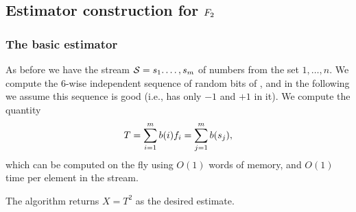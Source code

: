 
\subsection{Estimator construction for $F_2$}
\subsubsection{The basic estimator}

As before we have the stream $\mathcal{S} = {s}_1.\ldots, {s}_m$ of
numbers from the set $1, \ldots, n$. We compute the $6$-wise
independent sequence of random bits of
, and in the following we assume
this sequence is good (i.e., has only $-1$ and $+1$ in it). We compute
the quantity
\begin{equation*}
    T = \sum_{i=1}^m b(i) \frq_i%
    =%
    \sum_{j=1}^m b( \strm_j),
\end{equation*}
which can be computed on the fly using $O(1)$ words of memory, and
$O(1)$ time per element in the stream.


The algorithm returns $X = T^2$ as the desired estimate.

